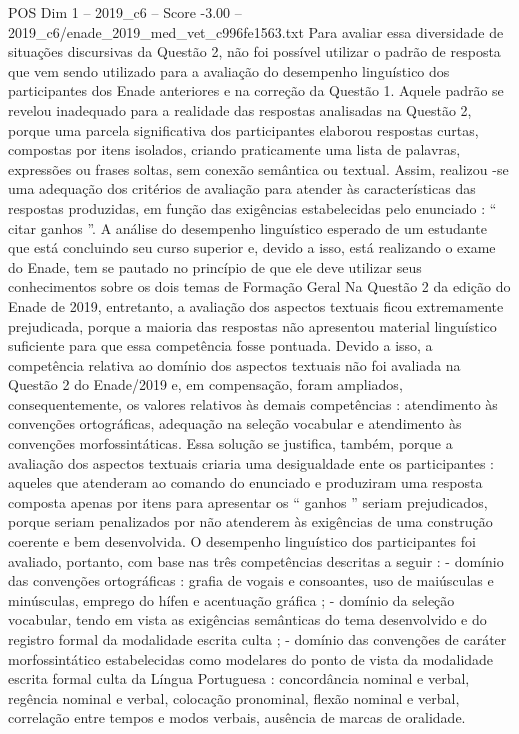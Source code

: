 \begin{textsample}{POS Dim 1 – 2019\_c6 – Score -3.00 – 2019\_c6/enade\_2019\_med\_vet\_c996fe1563.txt}
Para avaliar essa diversidade de situações discursivas da Questão 2, não foi possível utilizar o padrão de resposta que vem sendo utilizado para a avaliação do desempenho linguístico dos participantes dos Enade anteriores e na correção da Questão 1.
Aquele padrão se revelou inadequado para a realidade das respostas analisadas na Questão 2, porque uma parcela significativa dos participantes elaborou respostas curtas, compostas por itens isolados, criando praticamente uma lista de palavras, expressões ou frases soltas, sem conexão semântica ou textual.
Assim, realizou -se uma adequação dos critérios de avaliação para atender às características das respostas produzidas, em função das exigências estabelecidas pelo enunciado : “ citar ganhos ”.
A análise do desempenho linguístico esperado de um estudante que está concluindo seu curso superior e, devido a isso, está realizando o exame do Enade, tem se pautado no princípio de que ele deve utilizar seus conhecimentos sobre os dois temas de Formação Geral Na Questão 2 da edição do Enade de 2019, entretanto, a avaliação dos aspectos textuais ficou extremamente prejudicada, porque a maioria das respostas não apresentou material linguístico suficiente para que essa competência fosse pontuada.
Devido a isso, a competência relativa ao domínio dos aspectos textuais não foi avaliada na Questão 2 do Enade/2019 e, em compensação, foram ampliados, consequentemente, os valores relativos às demais competências : atendimento às convenções ortográficas, adequação na seleção vocabular e atendimento às convenções morfossintáticas.
Essa solução se justifica, também, porque a avaliação dos aspectos textuais criaria uma desigualdade ente os participantes : aqueles que atenderam ao comando do enunciado e produziram uma resposta composta apenas por itens para apresentar os “ ganhos ” seriam prejudicados, porque seriam penalizados por não atenderem às exigências de uma construção coerente e bem desenvolvida.
O desempenho linguístico dos participantes foi avaliado, portanto, com base nas três competências descritas a seguir : - domínio das convenções ortográficas : grafia de vogais e consoantes, uso de maiúsculas e minúsculas, emprego do hífen e acentuação gráfica ; - domínio da seleção vocabular, tendo em vista as exigências semânticas do tema desenvolvido e do registro formal da modalidade escrita culta ; - domínio das convenções de caráter morfossintático estabelecidas como modelares do ponto de vista da modalidade escrita formal culta da Língua Portuguesa : concordância nominal e verbal, regência nominal e verbal, colocação pronominal, flexão nominal e verbal, correlação entre tempos e modos verbais, ausência de marcas de oralidade.

\end{textsample}
